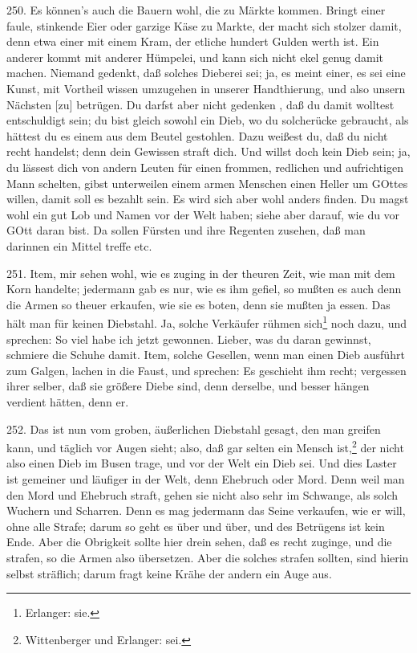 250. Es können’s auch die Bauern wohl, die zu Märkte kommen. Bringt einer faule, stinkende Eier oder garzige Käse zu Markte, der macht sich stolzer damit, denn etwa einer mit einem Kram, der etliche hundert Gulden werth ist. Ein anderer kommt mit anderer Hümpelei, und kann sich nicht ekel genug damit machen. Niemand gedenkt, daß solches Dieberei sei; ja, es meint einer, es sei eine Kunst, mit Vortheil wissen umzugehen in unserer Handthierung, und also unsern Nächsten [zu] betrügen. Du darfst aber nicht gedenken
, daß du damit wolltest entschuldigt sein; du bist gleich sowohl ein Dieb, wo du solcherücke gebraucht, als hättest du es einem aus dem Beutel gestohlen. Dazu weißest du, daß du nicht recht handelst; denn dein Gewissen straft dich. Und willst doch kein Dieb sein; ja, du lässest dich von andern Leuten für einen frommen, redlichen und aufrichtigen Mann schelten, gibst unterweilen einem armen Menschen einen Heller um GOttes willen, damit soll es bezahlt sein. Es wird sich aber wohl anders finden. Du magst wohl ein gut Lob und Namen vor der Welt haben; siehe aber darauf, wie du vor GOtt daran bist. Da sollen Fürsten und ihre Regenten zusehen, daß man darinnen ein Mittel treffe etc.

251. Item, mir sehen wohl, wie es zuging in der theuren Zeit, wie man mit dem Korn handelte; jedermann gab es nur, wie es ihm gefiel, so mußten es auch denn die Armen so theuer erkaufen, wie sie es boten, denn sie mußten ja essen. Das hält man für keinen Diebstahl. Ja, solche Verkäufer rühmen sich\footnote{Erlanger: sie.} noch dazu, und sprechen: So viel habe ich jetzt gewonnen. Lieber, was du daran gewinnst, schmiere die Schuhe damit. Item, solche Gesellen, wenn man einen Dieb ausführt zum Galgen, lachen in die Faust, und sprechen: Es geschieht ihm recht; vergessen ihrer selber, daß sie größere Diebe sind, denn derselbe, und besser hängen verdient hätten, denn er.

252. Das ist nun vom groben, äußerlichen Diebstahl gesagt, den man greifen kann, und täglich vor Augen sieht; also, daß gar selten ein Mensch ist,\footnote{Wittenberger und Erlanger: sei.} der nicht also einen Dieb im Busen trage, und vor der Welt ein Dieb sei. Und dies Laster ist gemeiner und läufiger in der Welt, denn Ehebruch oder Mord. Denn weil man den Mord und Ehebruch straft, gehen sie nicht also sehr im Schwange, als solch Wuchern und Scharren. Denn es mag jedermann das Seine verkaufen, wie er will, ohne alle Strafe; darum so geht es über und über, und des Betrügens ist kein Ende. Aber die Obrigkeit sollte hier drein sehen, daß es recht zuginge, und die strafen, so die Armen also übersetzen. Aber die solches strafen sollten, sind hierin selbst sträflich; darum fragt keine Krähe der andern ein Auge aus.

